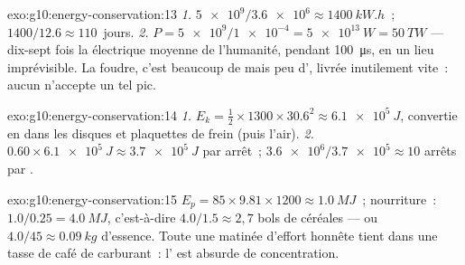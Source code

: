 \begin{solution}{exo:g10:energy-conservation:13}
\emph{1.} $\num{5e9}/\num{3.6e6} \approx \qty{1400}{kW.h}$~;
$1400/12.6 \approx 110$~jours.
\emph{2.} $P = \num{5e9}/\num{1e-4} = \qty{5e13}{W} = \qty{50}{TW}$
--- dix-sept fois la  électrique moyenne de
l'humanité, pendant \qty{100}{\micro s}, en un lieu imprévisible. La
foudre, c'est beaucoup de  mais peu
d', livrée inutilement vite~: aucun
 n'accepte un tel pic.
\end{solution}

\begin{solution}{exo:g10:energy-conservation:14}
\emph{1.} $E_k = \tfrac12 \times 1300 \times 30.6^2 \approx
\qty{6.1e5}{J}$, convertie en  dans les
disques et plaquettes de frein (puis l'air).
\emph{2.} $0.60 \times \qty{6.1e5}{J} \approx \qty{3.7e5}{J}$ par
arrêt~; $\num{3.6e6}/\num{3.7e5} \approx 10$ arrêts par
.
\end{solution}

\begin{solution}{exo:g10:energy-conservation:15}
$E_p = 85 \times 9.81 \times 1200 \approx \qty{1.0}{MJ}$~; nourriture~:
$1.0/0.25 = \qty{4.0}{MJ}$, c'est-à-dire $4.0/1.5 \approx 2{,}7$ bols
de céréales --- ou $4.0/45 \approx \qty{0.09}{kg}$ d'essence. Toute une
matinée d'effort honnête tient dans une tasse de café de carburant~:
l' est absurde de concentration.
\end{solution}

